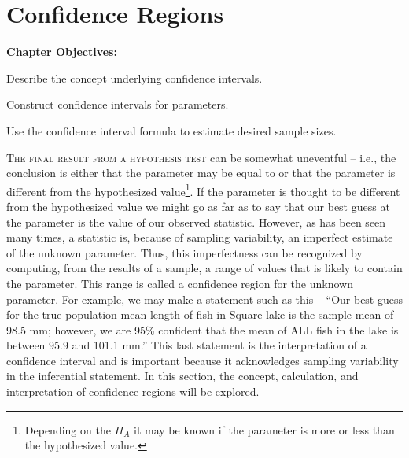 \documentclass[10pt,openany]{book}\usepackage[]{graphicx}\usepackage[]{color}
\begin{document}
\chapter{Confidence Regions} \label{chap:ConfidenceRegions}
\begin{ChapObj}{\boxwidth}
  \textbf{Chapter Objectives:}
  \begin{Enumerate}
    \item Describe the concept underlying confidence intervals.
    \item Construct confidence intervals for parameters.
    \item Use the confidence interval formula to estimate desired sample sizes.
  \end{Enumerate}
\end{ChapObj}

\minitoc
\newpage

\lettrine{T}{he final result from a hypothesis test}  can be somewhat uneventful -- i.e., the conclusion is either that the parameter may be equal to or that the parameter is different from the hypothesized value\footnote{Depending on the $H_{A}$ it may be known if the parameter is more or less than the hypothesized value.}.  If the parameter is thought to be different from the hypothesized value we might go as far as to say that our best guess at the parameter is the value of our observed statistic.  However, as has been seen many times, a statistic is, because of sampling variability, an imperfect estimate of the unknown parameter.  Thus, this imperfectness can be recognized by computing, from the results of a sample, a range of values that is likely to contain the parameter.  This range is called a confidence region for the unknown parameter.  For example, we may make a statement such as this -- ``Our best guess for the true population mean length of fish in Square lake is the sample mean of 98.5 mm; however, we are 95\% confident that the mean of ALL fish in the lake is between 95.9 and 101.1 mm.''  This last statement is the interpretation of a confidence interval and is important because it acknowledges sampling variability in the inferential statement.  In this section, the concept, calculation, and interpretation of confidence regions will be explored.
\end{document}
